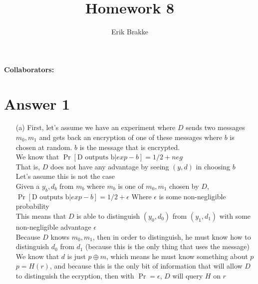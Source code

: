 \documentclass[11pt]{article}
\providecommand{\myparab}[1]{\smallskip\noindent\textbf{#1} }
\theoremstyle{definition}
\begin{document}
\title{Homework 8}
\author{Erik Brakke}
\maketitle

\thispagestyle{fancy}

\myparab{Collaborators: }
 
 
\section*{Answer 1}
\begin{enumerate}
	\item[(a)] First, let's assume we have an experiment where $D$ sends two messages $m_0,m_1$ and gets back an encryption of one of these messages where $b$ is chosen at random.  $b$ is the message that is encrypted.\\
We know that $\Pr[\text{D outputs b} | exp-b] = 1/2 + neg$\\
That is, $D$ does not have any advantage by seeing $(y,d)$ in choosing $b$\\
Let's assume this is not the case\\
Given a $y_b,d_b$ from $m_b$ where $m_b$ is one of $m_0,m_1$ chosen by $D$, $\Pr[\text{D outputs b}|exp-b] = 1/2 + \epsilon$ Where $\epsilon$ is some non-negligible probability\\
This means that $D$ is able to distinguish $(y_0,d_0)$ from $(y_1,d_1)$ with some non-negligible advantage $\epsilon$\\
Because $D$ knows $m_0,m_1$, then in order to distinguish, he must know how to distinguish $d_0$ from $d_1$ (because this is the only thing that uses the message)\\
We know that $d$ is just $p \oplus m$, which means he must know something about $p$\\
$p = H(r)$, and because this is the only bit of information that will allow $D$ to distinguish the ecryption, then with $\Pr = \epsilon$, $D$ will query $H$ on $r$\\


\end{enumerate}
\end{document}
